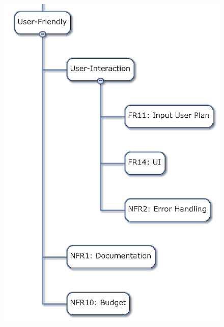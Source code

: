 \begin{figure}[h!]
\centering
\includegraphics[width=0.98\columnwidth]{figs/objectives_tree/objectives_tree_user_friendly.png}
\label{fig:obj_tree_user}
\end{figure}
